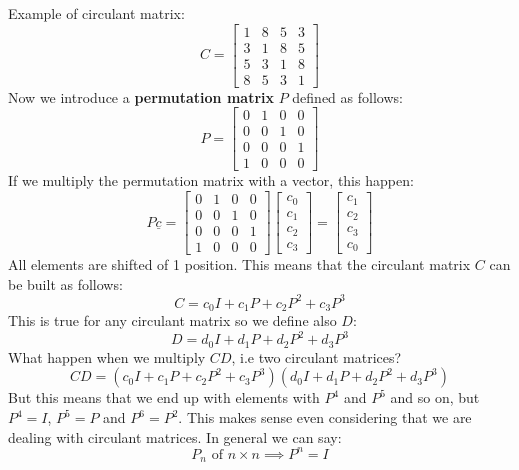 Example of circulant matrix:
\[
    C = \begin{bmatrix}
        1 & 8 & 5 & 3\\
        3 & 1 & 8 & 5\\
        5 & 3 & 1 & 8\\
        8 & 5 & 3 & 1
    \end{bmatrix}    
\]
Now we introduce a \textbf{permutation matrix} $P$ defined as follows:
\[
    P = \begin{bmatrix}
        0 & 1 & 0 & 0\\
        0 & 0 & 1 & 0\\
        0 & 0 & 0 & 1\\
        1 & 0 & 0 & 0
    \end{bmatrix}
\]
If we multiply the permutation matrix with a vector, this happen:
\[
    P \underline{c} = \begin{bmatrix}
        0 & 1 & 0 & 0\\
        0 & 0 & 1 & 0\\
        0 & 0 & 0 & 1\\
        1 & 0 & 0 & 0
    \end{bmatrix} \begin{bmatrix}
        c_0\\
        c_1\\
        c_2\\
        c_3
    \end{bmatrix} = \begin{bmatrix}
        c_1\\
        c_2\\
        c_3\\
        c_0
    \end{bmatrix}    
\]
All elements are shifted of 1 position. This means that the circulant matrix $C$ can be built as follows:
\[
    C = c_0 I + c_1 P + c_2 P^2 + c_3 P^3    
\]
This is true for any circulant matrix so we define also $D$:
\[
    D = d_0 I + d_1 P + d_2 P^2 + d_3 P^3 
\]
What happen when we multiply $CD$, i.e two circulant matrices?
\[
    CD = (c_0 I + c_1 P + c_2 P^2 + c_3 P^3)(d_0 I + d_1 P + d_2 P^2 + d_3 P^3)
\]
But this means that we end up with elements with $P^4$ and $P^5$ and so on, but $P^4 = I$, $P^5 = P$ and $P^6 = P^2$. This makes sense even considering that we are dealing with circulant matrices. In general we can say:
\[
    P_n \text{ of } n \times n \implies P^n = I    
\]

